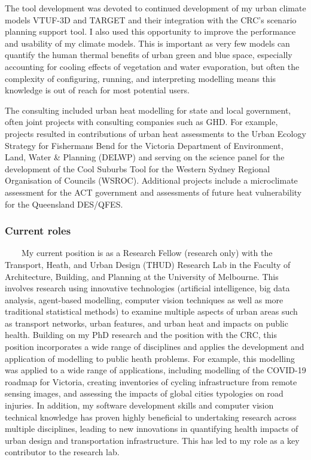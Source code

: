 The tool development was devoted to continued development of my urban climate models VTUF-3D and TARGET and their integration with the CRC's scenario planning support tool. I also used this opportunity to improve the performance and usability of my climate models. This is important as very few models can quantify the human thermal benefits of urban green and blue space, especially accounting for cooling effects of vegetation and water evaporation, but often the complexity of configuring, running, and interpreting modelling means this knowledge is out of reach for most potential users.



The consulting included urban heat modelling for state and local government, often joint projects with consulting companies such as GHD. For example, projects resulted in contributions of urban heat assessments to the Urban Ecology Strategy for Fishermans Bend for the Victoria Department of Environment, Land, Water \& Planning (DELWP) and serving on the science panel for the development of the Cool Suburbs Tool for the Western Sydney Regional Organisation of Councils (WSROC). Additional projects include a microclimate assessment for the ACT government and assessments of future heat vulnerability for the Queensland DES/QFES.


\subsubsection*{\textbf{Current roles}}


~~~~My current position is as a Research Fellow (research only)  with the Transport, Heath, and Urban Design (THUD) Research Lab in the Faculty of Architecture, Building, and Planning at the University of Melbourne. This involves research using innovative technologies (artificial intelligence, big data analysis, agent-based modelling, computer vision techniques as well as more traditional statistical methods) to examine multiple aspects of urban areas such as transport networks, urban features, and urban heat and impacts on public health. Building on my PhD research and the position with the CRC, this position incorporates a wide range of disciplines and applies the development and application of modelling to public heath problems. For example, this modelling was applied to a wide range of applications, including modelling of the COVID-19 roadmap for Victoria, creating inventories of cycling infrastructure from remote sensing images, and assessing the impacts of global cities typologies on road injuries. In addition, my software development skills and computer vision technical knowledge has proven highly beneficial to undertaking research across multiple disciplines, leading to new innovations in quantifying health impacts of urban design and transportation infrastructure. This has led to my role as a key contributor to the research lab.

